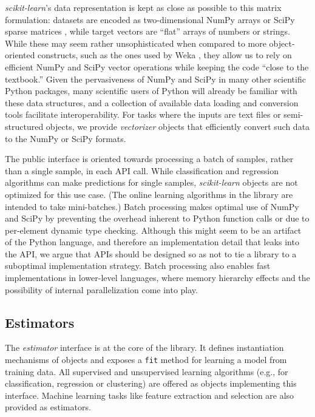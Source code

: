\documentclass[twocolumn]{article}
\newcommand{\sklearn}{\textit{scikit-learn}\xspace}
\begin{document}
\sklearn's data representation is kept as close as possible
to this matrix formulation: datasets are encoded as
two-dimensional NumPy arrays or SciPy sparse matrices \citep{vanderwalt2011},
while target vectors are ``flat'' arrays of numbers or strings.
While these may seem rather unsophisticated when
compared to more object-oriented constructs, such as the ones used by
Weka \citep{hall2009weka},
they allow us to rely on efficient NumPy and SciPy vector operations
while keeping the code ``close to the textbook.''
Given the pervasiveness of NumPy and SciPy in many other scientific Python
packages, many scientific users of Python
will already be familiar with these data structures,
and a collection of available data loading and conversion tools
facilitate interoperability.
For tasks where the inputs are text files or semi-structured
objects, we provide \textit{vectorizer} objects that efficiently convert such
data to the NumPy or SciPy formats.

The public interface is oriented towards processing a batch of samples,
rather than a single sample, in each API call. While classification
and regression algorithms can make predictions for single samples,
\sklearn objects are not optimized for this use case. (The online learning
algorithms in the library are intended to take mini-batches.) Batch processing makes
optimal use of NumPy and SciPy by preventing the overhead inherent to Python
function calls or due to per-element dynamic type checking. Although this might
seem to be an artifact of the Python language, and therefore an implementation
detail that leaks into the API, we argue that APIs should be designed so as not
to tie a library to a suboptimal implementation strategy.
Batch processing also enables fast implementations in lower-level languages, where memory
hierarchy effects and the possibility of internal parallelization come into
play.


\subsection{Estimators}
\label{sec:estimators}

The \textit{estimator} interface is at the core of the
library. It defines instantiation mechanisms of objects and exposes a
\texttt{fit} method for learning a model from training data.  All supervised and
unsupervised learning algorithms (e.g., for classification, regression or
clustering) are offered as objects implementing this interface. Machine
learning tasks like feature extraction and selection are also provided as estimators.
\end{document}
